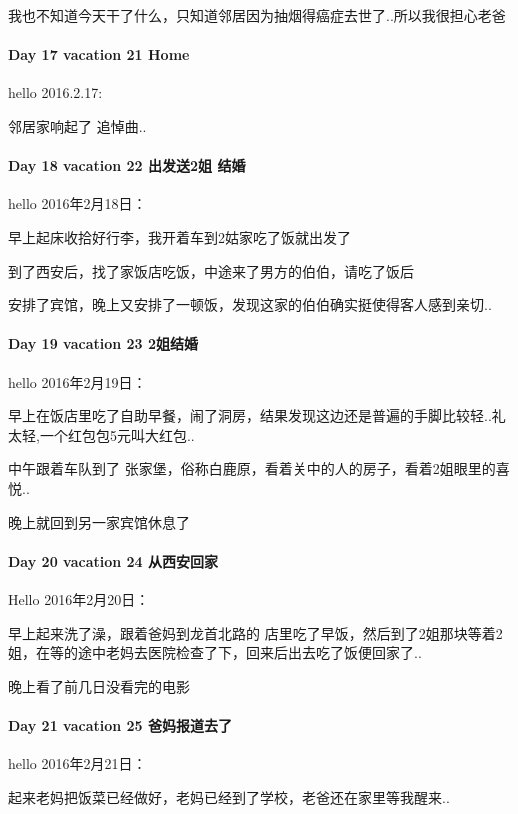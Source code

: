 \documentclass[UTF8,a4paper,8pt]{ctexbook}
\begin{document}
	 	 我也不知道今天干了什么，只知道邻居因为抽烟得癌症去世了..所以我很担心老爸
	 	 
 	 \paragraph{Day 17  vacation 21    \quad    Home }
	 	 hello 2016.2.17:
	 	 
	 	 邻居家响起了 追悼曲..
	 	 
 	 \paragraph{Day 18  vacation 22   \quad   出发送2姐  结婚}
	 	 hello 2016年2月18日：
	 	 
	 	 早上起床收拾好行李，我开着车到2姑家吃了饭就出发了
	 	 
	 	 到了西安后，找了家饭店吃饭，中途来了男方的伯伯，请吃了饭后
	 	 
	 	 安排了宾馆，晚上又安排了一顿饭，发现这家的伯伯确实挺使得客人感到亲切..
  	 \paragraph{Day 19  vacation 23    \quad   2姐结婚  }
	  	 hello 2016年2月19日：
	  	 
	  	 早上在饭店里吃了自助早餐，闹了洞房，结果发现这边还是普遍的手脚比较轻..礼太轻,一个红包包5元叫大红包..
	  	 
	  	 中午跟着车队到了 张家堡，俗称白鹿原，看着关中的人的房子，看着2姐眼里的喜悦..
	  	 
	  	 晚上就回到另一家宾馆休息了
	  	 
 	 \paragraph{Day 20  vacation 24   \quad   从西安回家  }
	 	 Hello 2016年2月20日：
	 	 
	 	 早上起来洗了澡，跟着爸妈到龙首北路的 店里吃了早饭，然后到了2姐那块等着2姐，在等的途中老妈去医院检查了下，回来后出去吃了饭便回家了..
	 	 
	 	 晚上看了前几日没看完的电影
 	 \paragraph{Day 21  vacation 25   \quad   爸妈报道去了  }
	 	 hello 2016年2月21日：
	 	 
	 	 起来老妈把饭菜已经做好，老妈已经到了学校，老爸还在家里等我醒来..
	 	 
\end{document}
